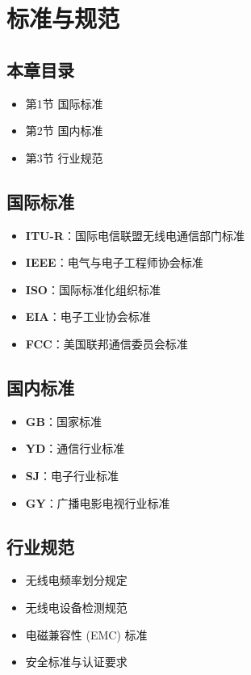 
\chapter{标准与规范}
\label{chap:standards}

\section{本章目录}
\begin{itemize}
    \item 第1节 国际标准
    \item 第2节 国内标准
    \item 第3节 行业规范
\end{itemize}

\section{国际标准}

\begin{itemize}
    \item \textbf{ITU-R}：国际电信联盟无线电通信部门标准
    \item \textbf{IEEE}：电气与电子工程师协会标准
    \item \textbf{ISO}：国际标准化组织标准
    \item \textbf{EIA}：电子工业协会标准
    \item \textbf{FCC}：美国联邦通信委员会标准
\end{itemize}

\section{国内标准}

\begin{itemize}
    \item \textbf{GB}：国家标准
    \item \textbf{YD}：通信行业标准
    \item \textbf{SJ}：电子行业标准
    \item \textbf{GY}：广播电影电视行业标准
\end{itemize}

\section{行业规范}

\begin{itemize}
    \item 无线电频率划分规定
    \item 无线电设备检测规范
    \item 电磁兼容性 (EMC) 标准
    \item 安全标准与认证要求
\end{itemize}